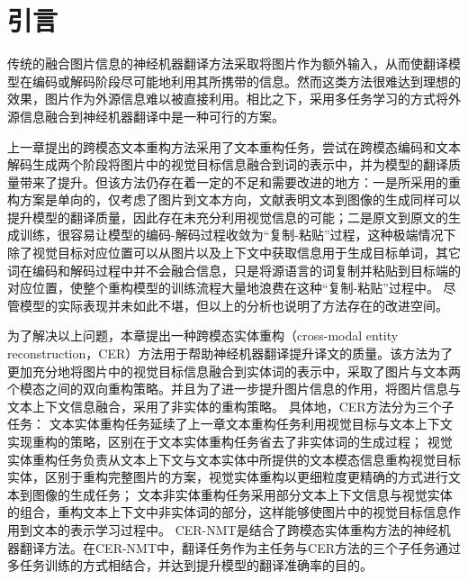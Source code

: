 \section{引言}
传统的融合图片信息的神经机器翻译方法采取将图片作为额外输入，从而使翻译模型在编码或解码阶段尽可能地利用其所携带的信息。然而这类方法很难达到理想的效果，图片作为外源信息难以被直接利用。相比之下，采用多任务学习的方式将外源信息融合到神经机器翻译中是一种可行的方案\cite{49_wang-zhang-2022-addressing,50_kang_zong_2022}。


上一章提出的跨模态文本重构方法采用了文本重构任务，尝试在跨模态编码和文本解码生成两个阶段将图片中的视觉目标信息融合到词的表示中，并为模型的翻译质量带来了提升。但该方法仍存在着一定的不足和需要改进的地方：一是所采用的重构方案是单向的，仅考虑了图片到文本方向，文献\cite{37_elliott-kadar-2017-imagination}表明文本到图像的生成同样可以提升模型的翻译质量，因此存在未充分利用视觉信息的可能；二是原文到原文的生成训练，很容易让模型的编码-解码过程收敛为“复制-粘贴”过程，这种极端情况下除了视觉目标对应位置可以从图片以及上下文中获取信息用于生成目标单词，其它词在编码和解码过程中并不会融合信息，只是将源语言的词复制并粘贴到目标端的对应位置，使整个重构模型的训练流程大量地浪费在这种“复制-粘贴”过程中。
尽管模型的实际表现并未如此不堪，但以上的分析也说明了方法存在的改进空间。

为了解决以上问题，本章提出一种跨模态实体重构（cross-modal entity reconstruction，CER）方法用于帮助神经机器翻译提升译文的质量。该方法为了更加充分地将图片中的视觉目标信息融合到实体词的表示中，采取了图片与文本两个模态之间的双向重构策略。并且为了进一步提升图片信息的作用，将图片信息与文本上下文信息融合，采用了非实体的重构策略。
具体地，CER方法分为三个子任务：
文本实体重构任务延续了上一章文本重构任务利用视觉目标与文本上下文实现重构的策略，区别在于文本实体重构任务省去了非实体词的生成过程；
视觉实体重构任务负责从文本上下文与文本实体中所提供的文本模态信息重构视觉目标实体，区别于重构完整图片的方案，视觉实体重构以更细粒度更精确的方式进行文本到图像的生成任务；
文本非实体重构任务采用部分文本上下文信息与视觉实体的组合，重构文本上下文中非实体词的部分，这样能够使图片中的视觉目标信息作用到文本的表示学习过程中。
CER-NMT是结合了跨模态实体重构方法的神经机器翻译方法。在CER-NMT中，翻译任务作为主任务与CER方法的三个子任务通过多任务训练的方式相结合，并达到提升模型的翻译准确率的目的。

